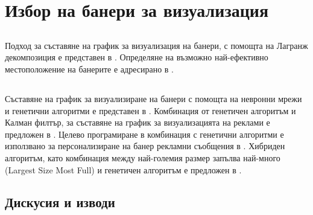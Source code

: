 \chapter{Избор на банери за визуализация}

\section{}

Подход за съставяне на график за визуализация на банери, с помощта на Лагранж декомпозиция е представен в \cite{10.1145/945846.945848}. Определяне на възможно най-ефективно местоположение на банерите е адресирано в \cite{Kaul2018}.

\section{}

Съставяне на график за визуализиране на банери с помощта на невронни мрежи и генетични алгоритми е представен в \cite{DEANE20125168}. Комбинация от генетичен алгоритъм и Калман филтър, за съставяне на график за визуализацията на реклами е предложен в \cite{doi:10.1287/mksc.17.3.214}. Целево програмиране в комбинация с генетични алгоритми е използвано за персонализиране на банер рекламни съобщения в \cite{KARUGA200185}. Хибриден алгоритъм, като комбинация между най-големия размер запълва най-много (Largest Size Most Full) и генетичен алгоритъм е предложен в \cite{KUMAR20061067}.

\section{}

\section{Дискусия и изводи}
